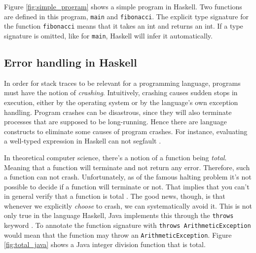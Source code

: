 Figure \ref{fig:simple_program} shows a simple program in Haskell.
Two functions are defined in this program, \texttt{main} and
\texttt{fibonacci}.  The explicit type signature for the function
\texttt{fibonacci} means that it takes an int and returns an int. If a type
signature is omitted, like for \texttt{main}, Haskell will infer it automatically.

\subsection{Error handling in Haskell} \label{sec:error_handling_in_haskell}

In order for stack traces to be relevant for a programming language, programs
must have the notion of \emph{crashing}. Intuitively, crashing causes sudden
stops in execution, either by the operating system or by the language's own
exception handling. Program crashes can be disastrous, since they will also
terminate processes that are supposed to be long-running. Hence there are
language constructs to eliminate some causes of program crashes.
For instance,
evaluating a well-typed expression in Haskell can not segfault \cite{FindingTheNeedle2009}.

In theoretical computer science, there's a notion of a function being \emph{total}. Meaning
that a function will terminate and not return any error. Therefore,
such a function can not crash. Unfortunately, as of the famous halting
problem it's not possible to decide if a function will terminate or not.
That implies that you can't in general
verify that a function is total \cite[p.380]{Hopcroft:2000}.
The good news, though, is that whenever we
explicitly \emph{choose} to crash, we can systematically avoid it. This is not
only true in the language Haskell, Java implements this through the
\texttt{throws} keyword \cite{oracle_java_doc_method_throws}. 
To annotate the function signature with \texttt{throws ArithmeticException}
would mean that the function may throw an \texttt{ArithmeticException}.
Figure \ref{fig:total_java} shows a Java integer division function that
is total.

